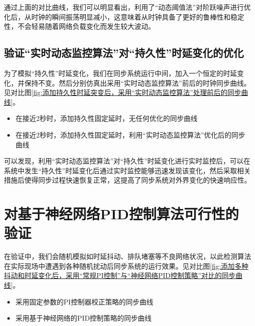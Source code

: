 通过上面的对比曲线，我们可以明显看出，利用了“动态阈值法”对阶跃噪声进行优化后，从时钟的瞬间振荡明显减小，这意味着从时钟具备了更好的鲁棒性和稳定性，不会轻易随着网络负载变化而发生较大波动。

\subsection{验证“实时动态监控算法”对“持久性”时延变化的优化}
为了模拟“持久性”时延变化，我们在同步系统运行中间，加入一个恒定的时延变化，并保持不变。然后分别仿真出采用“实时动态监控算法”前后的时钟同步曲线。见对比图\ref{fig:添加持久性时延突变后，采用“实时动态监控算法”处理前后的同步曲线}。
\begin{itemize}[noitemsep,topsep=0pt,parsep=0pt,partopsep=0pt]
  \item 在接近2秒时，添加持久性固定延时，无任何优化的同步曲线
  \item 在接近2秒时，添加持久性固定延时，利用“实时动态监控算法”优化后的同步曲线
\end{itemize}
\begin{figure}
  \centering
  \hspace{1in}
\end{figure}

可以发现，利用“实时动态监控算法”对“持久性”时延变化进行实时监控后，可以在系统中发生“持久性”时延变化后通过实时监控能够迅速发现该变化，然后采取相关措施后使得同步过程快速恢复正常，这提高了同步系统对外界变化的快速响应性。

\section{对基于神经网络PID控制算法可行性的验证}
在验证中，我们会随机模拟如时延抖动、排队堵塞等不良网络状况，以此检测算法在实际现场中遭遇到各种随机扰动后同步系统的运行效果。见对比图\ref{fig:添加多种抖动和时延变化后，采用“常规PI控制”与“神经网络PID控制策略”对比的同步曲线}。
\begin{itemize}[noitemsep,topsep=0pt,parsep=0pt,partopsep=0pt]
  \item 采用固定参数的PI控制器校正策略的同步曲线
  \item 采用基于神经网络的PID控制策略的同步曲线
\end{itemize}

